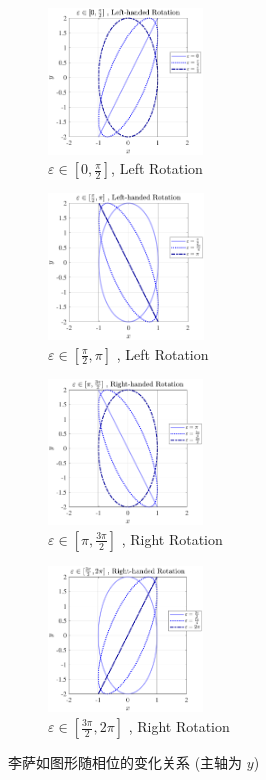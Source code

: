 \documentclass[UTF8]{article}
\theoremstyle{MyLineTheoremStyle} %
\theoremstyle{MyBlockTheoremStyle} %
\theoremstyle{MySubsubsectionStyle} %
\begin{document}
\begin{figure}[H]\centering
    \begin{subfigure}[b]{0.24\columnwidth}\centering
        \includegraphics[height=110pt]{assets/5.5/2024-11-20_15-43-12.pdf}
        \caption{$\varepsilon \in [0, \frac{\pi}{2}]$, Left Rotation}
    \end{subfigure}
    \begin{subfigure}[b]{0.24\columnwidth}\centering
        \includegraphics[height=110pt]{assets/5.5/2024-11-20_15-43-14.pdf}
        \caption{$\varepsilon \in [\frac{\pi}{2}, \pi]$ , Left Rotation}
    \end{subfigure}
    \begin{subfigure}[b]{0.24\columnwidth}\centering
        \includegraphics[height=110pt]{assets/5.5/2024-11-20_15-43-16.pdf}
        \caption{$\varepsilon \in [\pi, \frac{3\pi}{2}]$ , Right Rotation}
    \end{subfigure}
    \begin{subfigure}[b]{0.24\columnwidth}\centering
        \includegraphics[height=110pt]{assets/5.5/2024-11-20_15-43-18.pdf}
        \caption{$\varepsilon \in [\frac{3\pi}{2}, 2\pi]$ , Right Rotation}
    \end{subfigure}
    \caption{李萨如图形随相位的变化关系 (主轴为 $y$)}
\end{figure}
\end{document}
